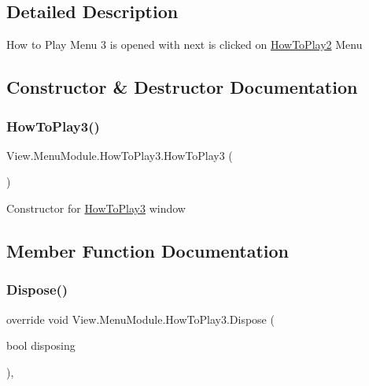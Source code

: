 \subsection{Detailed Description}
How to Play Menu 3 is opened with next is clicked on \hyperlink{class_view_1_1_menu_module_1_1_how_to_play2}{How\+To\+Play2} Menu 



\subsection{Constructor \& Destructor Documentation}
\hypertarget{class_view_1_1_menu_module_1_1_how_to_play3_ad513e8bee12c26650d728609e59b208d}{}\label{class_view_1_1_menu_module_1_1_how_to_play3_ad513e8bee12c26650d728609e59b208d} 
\subsubsection{\texorpdfstring{How\+To\+Play3()}{HowToPlay3()}}
{\footnotesize\ttfamily View.\+Menu\+Module.\+How\+To\+Play3.\+How\+To\+Play3 (\begin{DoxyParamCaption}{ }\end{DoxyParamCaption})\hspace{0.3cm}{\ttfamily [inline]}}

Constructor for \hyperlink{class_view_1_1_menu_module_1_1_how_to_play3}{How\+To\+Play3} window 

\subsection{Member Function Documentation}
\hypertarget{class_view_1_1_menu_module_1_1_how_to_play3_a8335930fd58168dbcc5eddc120829d60}{}\label{class_view_1_1_menu_module_1_1_how_to_play3_a8335930fd58168dbcc5eddc120829d60} 
\subsubsection{\texorpdfstring{Dispose()}{Dispose()}}
{\footnotesize\ttfamily override void View.\+Menu\+Module.\+How\+To\+Play3.\+Dispose (\begin{DoxyParamCaption}\item[{bool}]{disposing }\end{DoxyParamCaption})\hspace{0.3cm}{\ttfamily [inline]}, {\ttfamily [protected]}}



